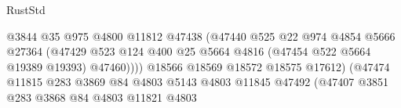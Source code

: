 \begin{lexlean}{RustStd}
\begin{coremodule}
                                                    @3844
                                                    @35
                                                    @975
                                                    @4800
                                                    @11812
                                                    @47438
                                                    (@47440
                                                      @525
                                                      @22
                                                      @974
                                                      @4854
                                                      @5666
                                                      @27364
                                                      (@47429
                                                        @523
                                                        @124
                                                        @400
                                                        @25
                                                        @5664
                                                        @4816
                                                        (@47454 @522 @5664 @19389 @19393)
                                                        @47460))))
                                                @18566
                                                @18569
                                                @18572
                                                @18575
                                                @17612)
                                              (@47474
                                                @11815
                                                @283
                                                @3869
                                                @84
                                                @4803
                                                @5143
                                                @4803
                                                @11845
                                                @47492
                                                (@47407
                                                  @3851
                                                  @283
                                                  @3868
                                                  @84
                                                  @4803
                                                  @11821
                                                  @4803

\end{coremodule}
\end{lexlean}
